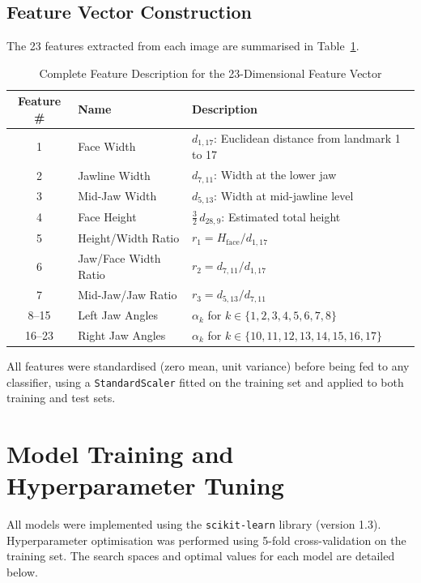 \subsection{Feature Vector Construction}
The 23 features extracted from each image are summarised in Table~\ref{tab:features}.

\begin{table}[H]
\centering
\caption{Complete Feature Description for the 23-Dimensional Feature Vector}
\label{tab:features}
\begin{tabular}{clp{6.5cm}}
\toprule
\textbf{Feature \#} & \textbf{Name} & \textbf{Description} \\
\midrule
1  & Face Width          & $d_{1,17}$: Euclidean distance from landmark 1 to 17 \\
2  & Jawline Width       & $d_{7,11}$: Width at the lower jaw \\
3  & Mid-Jaw Width       & $d_{5,13}$: Width at mid-jawline level \\
4  & Face Height         & $\frac{3}{2}\,d_{28,9}$: Estimated total height \\
5  & Height/Width Ratio  & $r_1 = H_{\text{face}} / d_{1,17}$ \\
6  & Jaw/Face Width Ratio & $r_2 = d_{7,11} / d_{1,17}$ \\
7  & Mid-Jaw/Jaw Ratio   & $r_3 = d_{5,13} / d_{7,11}$ \\
8--15  & Left Jaw Angles   & $\alpha_k$ for $k \in \{1,2,3,4,5,6,7,8\}$ \\
16--23 & Right Jaw Angles  & $\alpha_k$ for $k \in \{10,11,12,13,14,15,16,17\}$ \\
\bottomrule
\end{tabular}
\end{table}

All features were standardised (zero mean, unit variance) before being fed to any classifier, using a \texttt{StandardScaler} fitted on the training set and applied to both training and test sets.

\section{Model Training and Hyperparameter Tuning}
\label{sec:meth_training}

All models were implemented using the \texttt{scikit-learn} library (version 1.3). Hyperparameter optimisation was performed using 5-fold cross-validation on the training set. The search spaces and optimal values for each model are detailed below.

